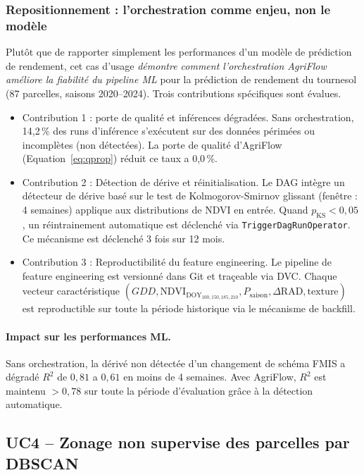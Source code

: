 \documentclass[12pt]{article}
\begin{document}
\subsubsection{Repositionnement : l'orchestration comme enjeu, non le modèle}

Plutôt que de rapporter simplement les performances d'un modèle de prédiction de rendement, cet cas d'usage \emph{démontre comment l'orchestration AgriFlow améliore la fiabilité du pipeline ML} pour la prédiction de rendement du tournesol (87 parcelles, saisons 2020--2024). Trois contributions spécifiques sont évalues.

\begin{itemize}
	\item{Contribution 1 : porte de qualité et inférences dégradées.} Sans orchestration, 14,2\,\% des runs d’inférence s’exécutent sur
des données périmées ou incomplètes (non détectées). La porte de qualité d'AgriFlow (Equation~\ref{eq:qprop}) réduit ce taux a 0,0\,\%.

\item {Contribution 2 : Détection de dérive et réinitialisation.} Le DAG intègre un détecteur de dérive basé sur le test de Kolmogorov-Smirnov glissant (fenêtre : 4 semaines) applique aux distributions de NDVI en entrée. Quand $p_{\text{KS}} < 0{,}05$, un réintrainement automatique est déclenché via \texttt{TriggerDagRunOperator}. Ce mécanisme est déclenché 3 fois sur 12 mois.

\item {Contribution 3 : Reproductibilité du feature engineering.} Le pipeline de feature engineering est versionné dans Git et traçeable via DVC. Chaque vecteur caractéristique $(GDD, \text{NDVI}_{\text{DOY}_{100,150,185,210}}, P_{\text{saison}}, \Delta\text{RAD}, \text{texture})$ est reproductible sur toute la période historique via le mécanisme de backfill.
\end{itemize}
\paragraph{Impact sur les performances ML.} Sans orchestration, la dérivé non détectée d'un changement de schéma FMIS a dégradé $R^2$ de $0{,}81$ a $0{,}61$ en moins de 4 semaines. Avec AgriFlow, $R^2$ est maintenu $> 0{,}78$ sur toute la période d’évaluation grâce à la détection automatique.


\subsection{UC4 -- Zonage non supervise des parcelles par DBSCAN}
\label{subsec:uc4}
\end{document}
